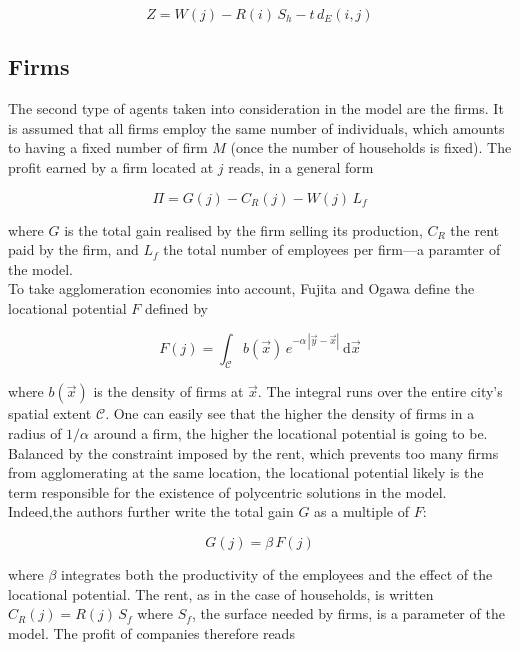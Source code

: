 \begin{equation}
    Z = W\left(j\right)
      - R\left(i\right)\,S_h
      - t\,d_E\left(i,j\right)
\end{equation} 


\subsection{Firms}
\label{sub:firms}

The second type of agents taken into consideration in the model are the firms.
It is assumed that all firms employ the same number of individuals, which
amounts to having a fixed number of firm $M$ (once the number of households is
fixed). The profit earned by a firm  located at $j$ reads, in a general
form

\begin{equation}
    \Pi = G\left(j\right) 
        - C_R\left(j\right) 
        -  W\left(j\right)\,L_f
\end{equation}

where $G$ is the total gain realised by the firm selling its production, $C_R$
the rent paid by the firm, and $L_f$ the total number of employees per firm---a
paramter of the model.\\

To take agglomeration economies into account, Fujita and Ogawa define the
locational potential $F$ defined by

\begin{equation}
    F\left(j\right) = \int_{\mathcal{C}} b(\vec{x})\,e^{-\alpha\,\left|\vec{y}-\vec{x}\right|}\:\mathrm{d}\vec{x}
\end{equation}

where $b(\vec{x})$ is the density of firms at $\vec{x}$. The integral runs over
the entire city's spatial extent $\mathcal{C}$. One can easily see that the
higher the density of firms in a radius of $1/\alpha$ around a firm, the higher
the locational potential is going to be. Balanced by the constraint imposed by
the rent, which prevents too many firms from agglomerating at the same location,
the locational potential likely is the term responsible for the existence of
polycentric solutions in the model. Indeed,the authors further write the total
gain $G$ as a multiple of $F$:

\begin{equation}
    G(j) = \beta\,F(j)
\end{equation}

where $\beta$ integrates both the productivity of the employees and the effect
of the locational potential. The rent, as
in the case of households, is written $C_R(j) = R(j)\,S_f$ where $S_f$, the
surface needed by firms, is a parameter of the model. The profit
of companies therefore reads

